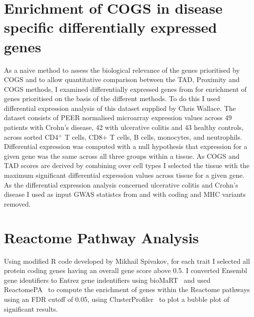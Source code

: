 \documentclass[a4paper,11pt]{report}
\begin{document}
\section{Enrichment of COGS in disease specific differentially expressed genes}
As a naive method to assess the biological relevance of the genes prioritised by COGS and to allow quantitative comparison between the TAD, Proximity and COGS methods, I examined  differentially expressed genes from \citet{PetersLyonsLeeEtAl2016} for enrichment of genes prioritised on the basis of the different methods. To do this I used differential expression analysis of this dataset supplied by Chris Wallace. The dataset consists of PEER normalised microarray expression values across 49 patients with Crohn's disease, 42 with ulcerative colitis and 43 healthy controls, across sorted  CD4$^+$ T cells, CD8$+$ T cells, B cells, monocytes, and neutrophils. Differential expression was computed with a null hypothesis that expression for a given gene was the same across all three groups within a tissue. As COGS and TAD scores are derived by combining over cell types I selected the tissue with the maximum significant differential expression values across tissue for a given gene. As the differential expression analysis concerned ulcerative colitis and Crohn's disease I used as input GWAS statistcs from \citet{Anderson2011-ch} and \citet{Franke2010-mj} with coding and MHC variants removed.

\section{Reactome Pathway Analysis}
Using modified R code developed by Mikhail Spivakov, for each trait I selected all protein coding genes having an overall gene score above 0.5. I converted Ensembl gene identifiers to Entrez gene indentifiers using bioMaRT~\citep{DurinckSpellmanBirneyEtAl2009} and used ReactomePA~\citep{YuHe2016} to compute the enrichment of genes within the Reactome pathways using an FDR cutoff of 0.05, using ClusterProfiler~\citep{YuWangHanEtAl2012} to plot a bubble plot of significant results.  
\end{document}
